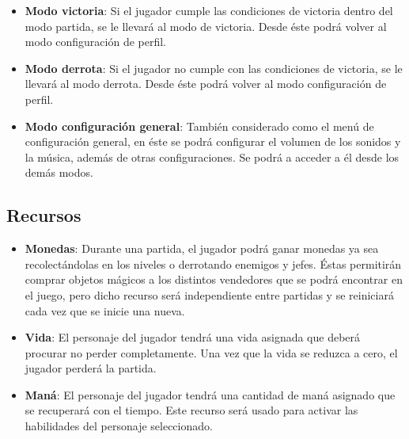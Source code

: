 \begin{itemize}
    \item \textbf{Modo victoria}: Si el jugador cumple las condiciones de
    victoria dentro del modo partida, se le llevará al modo de victoria. Desde
    éste podrá volver al modo configuración de perfil.

    \item \textbf{Modo derrota}: Si el jugador no cumple con las condiciones de
    victoria, se le llevará al modo derrota. Desde éste podrá volver al modo
    configuración de perfil.

    \item \textbf{Modo configuración general}: También considerado como el
    menú de configuración general, en éste se podrá configurar el volumen de
    los sonidos y la música, además de otras configuraciones. Se podrá a acceder
    a él desde los demás modos.
\end{itemize}


\subsection{Recursos}

\begin{itemize}
    \item \textbf{Monedas}: Durante una partida, el jugador podrá ganar monedas
    ya sea recolectándolas en los niveles o derrotando enemigos y jefes. Éstas
    permitirán comprar objetos mágicos a los distintos vendedores que se podrá
    encontrar en el juego, pero dicho recurso será independiente entre partidas
    y se reiniciará cada vez que se inicie una nueva.
    \item \textbf{Vida}: El personaje del jugador tendrá una vida asignada que deberá procurar no perder completamente. Una vez que la vida se reduzca a cero, el jugador perderá la partida.
    \item \textbf{Maná}: El personaje del jugador tendrá una cantidad de maná asignado que se recuperará con el tiempo. Este recurso será usado para activar las habilidades del personaje seleccionado.
\end{itemize}